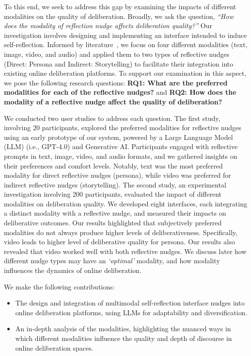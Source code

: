 To this end, we seek to address this gap by examining the impacts of different modalities on the quality of deliberation. Broadly, we ask the question, \textit{``How does the modality of reflection nudge affects deliberation quality?''} Our investigation involves designing and implementing an interface intended to induce self-reflection. Informed by literature~\cite{mayer2005cambridge, fadel2008multimodal, paivio1990mental, fleming2001vark, fleming1992not}, we focus on four different modalities (text, image, video, and audio) and applied them to two types of reflective nudges (Direct: Persona and Indirect: Storytelling) to facilitate their integration into existing online deliberation platforms. To support our examination in this aspect, we pose the following research questions: \textbf{RQ1: What are the preferred modalities for each of the reflective nudges?} and \textbf{RQ2: How does the modality of a reflective nudge affect the quality of deliberation?}

We conducted two user studies to address each question. The first study, involving 20 participants, explored the preferred modalities for reflective nudges using an early prototype of our system, powered by a Large Language Model (LLM) (i.e., GPT-4.0) and Generative AI. Participants engaged with reflective prompts in text, image, video, and audio formats, and we gathered insights on their preferences and comfort levels. Notably, text was the most preferred modality for direct reflective nudges (persona), while video was preferred for indirect reflective nudges (storytelling). The second study, an experimental investigation involving 200 participants, evaluated the impact of different modalities on deliberation quality. We developed eight interfaces, each integrating a distinct modality with a reflective nudge, and measured their impacts on deliberative outcomes. Our results highlighted that subjectively preferred modalities do not always produce higher levels of deliberativeness. Specifically, video leads to higher level of deliberative quality for persona. Our results also revealed that video worked well with both reflective nudges. We discuss later how different nudge types may have an \textit{`optimal'} modality, and how modality influences the dynamics of online deliberation.

We make the following contributions:
\begin{itemize}
    \item The design and integration of multimodal self-reflection interface nudges into online deliberation platforms, using LLMs for adaptability and diversification.
    \item An in-depth analysis of the modalities, highlighting the nuanced ways in which different modalities influence the quality and depth of discourse in online deliberation spaces.
\end{itemize}